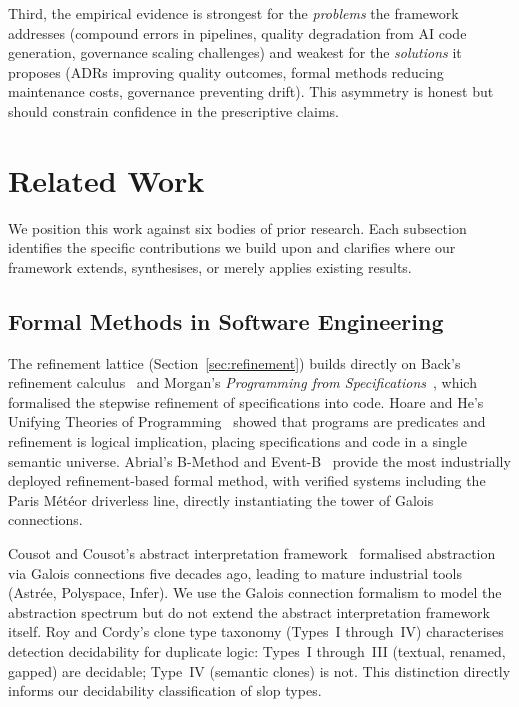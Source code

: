 Third, the empirical evidence is strongest for the \emph{problems} the framework
addresses (compound errors in pipelines, quality degradation from AI code
generation, governance scaling challenges) and weakest for the \emph{solutions}
it proposes (ADRs improving quality outcomes, formal methods reducing
maintenance costs, governance preventing drift).  This asymmetry is honest but
should constrain confidence in the prescriptive claims.


\section{Related Work}
\label{sec:related}

We position this work against six bodies of prior research.  Each subsection
identifies the specific contributions we build upon and clarifies where our
framework extends, synthesises, or merely applies existing results.


\subsection{Formal Methods in Software Engineering}

The refinement lattice (Section~\ref{sec:refinement}) builds directly on Back's
refinement calculus~\citep{back1980correctness} and Morgan's \emph{Programming
from Specifications}~\citep{morgan1994programming}, which formalised the
stepwise refinement of specifications into code.  Hoare and He's Unifying
Theories of Programming~\citep{hoare1998unifying} showed that programs are
predicates and refinement is logical implication, placing specifications and
code in a single semantic universe.  Abrial's B-Method and
Event-B~\citep{abrial2010modeling} provide the most industrially deployed
refinement-based formal method, with verified systems including the Paris
M\'{e}t\'{e}or driverless line, directly instantiating the tower of Galois
connections.

Cousot and Cousot's abstract interpretation
framework~\citep{cousot1977abstract} formalised abstraction via Galois
connections five decades ago, leading to mature industrial tools (Astr\'{e}e,
Polyspace, Infer).  We use the Galois connection formalism to model the
abstraction spectrum but do not extend the abstract interpretation framework
itself.  Roy and Cordy's clone type taxonomy (Types~I through~IV) characterises
detection decidability for duplicate logic: Types~I through~III (textual,
renamed, gapped) are decidable; Type~IV (semantic clones) is not.  This
distinction directly informs our decidability classification of slop types.

